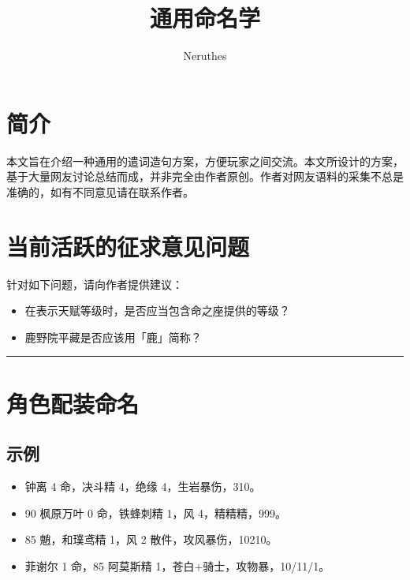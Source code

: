 
\uselangzh
\title{通用命名学}
\author{Neruthes}

\usepackage{datetime2}
\usepackage{longtable}
\usepackage{tabu}
\usepackage{tasks}

\setlength{\tabulinesep}{5pt}









\section*{简介}

本文旨在介绍一种通用的遣词造句方案，方便玩家之间交流。本文所设计的方案，基于大量网友讨论总结而成，并非完全由作者原创。作者对网友语料的采集不总是准确的，如有不同意见请在联系作者。

\section*{当前活跃的征求意见问题}

针对如下问题，请向作者提供建议：

\begin{itemize}
	\item 在表示天赋等级时，是否应当包含命之座提供的等级？
	\item 鹿野院平藏是否应该用「鹿」简称？
\end{itemize}

\maketoc{}{}

\vspace{2em}
\hrule

\section{角色配装命名}

\subsection{示例}


\begin{itemize}
	\item 钟离 4 命，决斗精 4，绝缘 4，生岩暴伤，310。
	\item 90 枫原万叶 0 命，铁蜂刺精 1，风 4，精精精，999。
	\item 85 魈，和璞鸢精 1，风 2 散件，攻风暴伤，10210。
	\item 菲谢尔 1 命，85 阿莫斯精 1，苍白+骑士，攻物暴，10/11/1。
\end{itemize}


